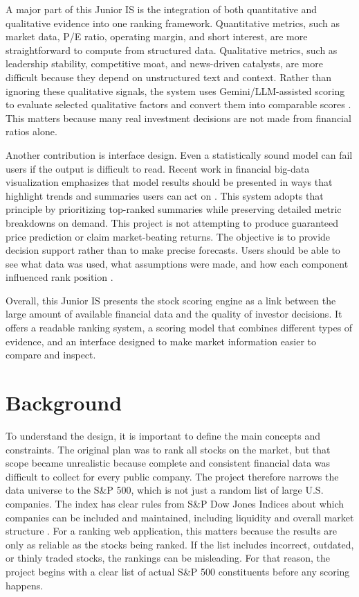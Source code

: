 \documentclass[12pt]{article}
\begin{document}
A major part of this Junior IS is the integration of both quantitative and qualitative evidence into one ranking framework. Quantitative metrics, such as market data, P/E ratio, operating margin, and short interest, are more straightforward to compute from structured data. Qualitative metrics, such as leadership stability, competitive moat, and news-driven catalysts, are more difficult because they depend on unstructured text and context. Rather than ignoring these qualitative signals, the system uses Gemini/LLM-assisted scoring to evaluate selected qualitative factors and convert them into comparable scores \cite{Schumaker2009Textual,dos-santos-pinheiro-dras-2017-stock}. This matters because many real investment decisions are not made from financial ratios alone.

Another contribution is interface design. Even a statistically sound model can fail users if the output is difficult to read. Recent work in financial big-data visualization emphasizes that model results should be presented in ways that highlight trends and summaries users can act on \cite{Dong2024FinancialViz}. This system adopts that principle by prioritizing top-ranked summaries while preserving detailed metric breakdowns on demand.
This project is not attempting to produce guaranteed price prediction or claim market-beating returns. The objective is to provide decision support rather than to make precise forecasts.
Users should be able to see what data was used, what assumptions were made, and how each component influenced rank position \cite{behzadian2012vikor}. 

Overall, this Junior IS presents the stock scoring engine as a link between the large amount of available financial data and the quality of investor decisions. It offers a readable ranking system, a scoring model that combines different types of evidence, and an interface designed to make market information easier to compare and inspect. 

\section{Background}

To understand the design, it is important to define the main concepts and constraints. The original plan was to rank all stocks on the market, but that scope became unrealistic because complete and consistent financial data was difficult to collect for every public company. The project therefore narrows the data universe to the S\&P 500, which is not just a random list of large U.S. companies. The index has clear rules from S\&P Dow Jones Indices about which companies can be included and maintained, including liquidity and overall market structure \cite{SPGlobal2016Methodology}. For a ranking web application, this matters because the results are only as reliable as the stocks being ranked. If the list includes incorrect, outdated, or thinly traded stocks, the rankings can be misleading. For that reason, the project begins with a clear list of actual S\&P 500 constituents before any scoring happens.
\end{document}
